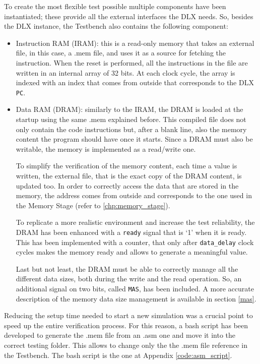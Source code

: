 To create the most flexible test possible multiple components have been instantiated; these provide all the external interfaces the DLX needs. So, besides the DLX instance, the Testbench also contains the following component:
\begin{itemize} 
    \item Instruction RAM (IRAM): this is a read-only memory that takes an external file, in this case, a .mem file, and uses it as a source for fetching the instruction. When the reset is performed, all the instructions in the file are written in an internal array of 32 bits. At each clock cycle, the array is indexed with an index that comes from outside that corresponds to the DLX \texttt{PC}.
    \item Data RAM (DRAM): similarly to the IRAM, the DRAM is loaded at the startup using the same .mem explained before. This compiled file does not only contain the code instructions but, after a blank line, also the memory content the program should have once it starts. Since a DRAM must also be writable, the memory is implemented as a read/write one. 
    
    To simplify the verification of the memory content, each time a value is written, the external file, that is the exact copy of the DRAM content, is updated too.
    In order to correctly access the data that are stored in the memory, the address comes from outside and corresponds to the one used in the Memory Stage (refer to \ref{chp:memory_stage}).
    
    To replicate a more realistic environment and increase the test reliability, the DRAM has been enhanced with a \texttt{ready} signal that is `1' when it is ready. This has been implemented with a counter, that only after \texttt{data\_delay} clock cycles makes the memory ready and allows to generate a meaningful value.
    
    Last but not least, the DRAM must be able to correctly manage all the different data sizes, both during the write and the read operation. So, an additional signal on two bits, called \texttt{MAS}, has been included. A more accurate description of the memory data size management is available in section \ref{mas}.
\end{itemize}

Reducing the setup time needed to start a new simulation was a crucial point to speed up the entire verification process. For this reason, a bash script has been developed to generate the .mem file from an .asm one and move it into the correct testing folder. This allows to change only the the .mem file reference in the Testbench. The bash script is the one at Appendix \ref{code:asm_script}.



